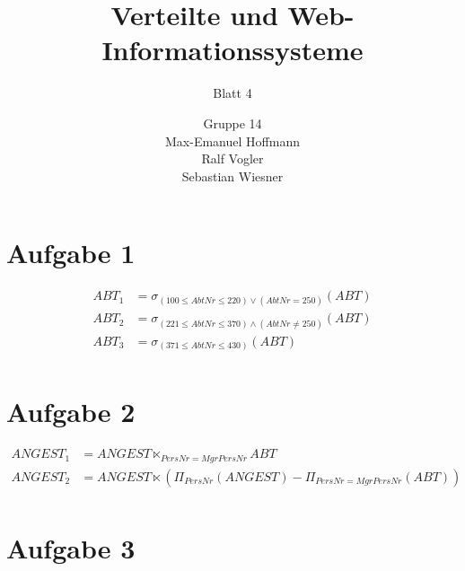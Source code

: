 \documentclass[11pt,a4paper]{scrartcl}
\begin{document}
\author{Gruppe 14\\Max-Emanuel Hoffmann\\Ralf Vogler\\Sebastian Wiesner}
\title{Verteilte und Web-Informationssysteme}
\subtitle{Blatt 4}

\maketitle

\section*{Aufgabe 1}

\begin{align*}
  ABT_1 &= \sigma_{(100 \leq AbtNr \leq 220) \vee (AbtNr = 250)}(ABT) \\
  ABT_2 &= \sigma_{(221 \leq AbtNr \leq 370) \wedge (AbtNr \neq 250)}(ABT) \\
  ABT_3 &= \sigma_{(371 \leq AbtNr \leq 430)}(ABT) \\
\end{align*}

\section*{Aufgabe 2}

\begin{align*}
  ANGEST_1 &= ANGEST \ltimes_{PersNr=MgrPersNr} ABT \\
  ANGEST_2 &= ANGEST \ltimes (\Pi_{PersNr}(ANGEST) - \Pi_{PersNr=MgrPersNr}(
  ABT)) \\
\end{align*}

\section*{Aufgabe 3}
\end{document}
